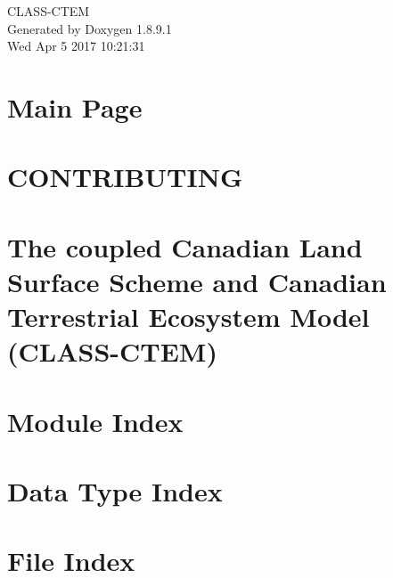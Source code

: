 \documentclass[twoside]{book}
\newcommand{\+}{\discretionary{\mbox{\scriptsize$\hookleftarrow$}}{}{}}
\newcommand{\clearemptydoublepage}{%
  \newpage{\pagestyle{empty}\cleardoublepage}%
}
\begin{document}
\hypersetup{pageanchor=false,
             bookmarks=true,
             bookmarksnumbered=true,
             pdfencoding=unicode
            }
\begin{titlepage}
\vspace*{7cm}
\begin{center}%
{\Large C\+L\+A\+S\+S-\/\+C\+T\+E\+M }\\
\vspace*{1cm}
{\large Generated by Doxygen 1.8.9.1}\\
\vspace*{0.5cm}
{\small Wed Apr 5 2017 10:21:31}\\
\end{center}
\end{titlepage}
\clearemptydoublepage
\tableofcontents
\clearemptydoublepage
{}
\hypersetup{pageanchor=true}

\chapter{Main Page}
\label{index}\hypertarget{index}{}
\chapter{C\+O\+N\+T\+R\+I\+B\+U\+T\+I\+N\+G}
\label{md_CONTRIBUTING}
\hypertarget{md_CONTRIBUTING}{}

\chapter{The coupled Canadian Land Surface Scheme and Canadian Terrestrial Ecosystem Model (C\+L\+A\+S\+S-\/\+C\+T\+E\+M)}
\label{md_README}
\hypertarget{md_README}{}

\chapter{Module Index}

\chapter{Data Type Index}

\chapter{File Index}

\end{document}
